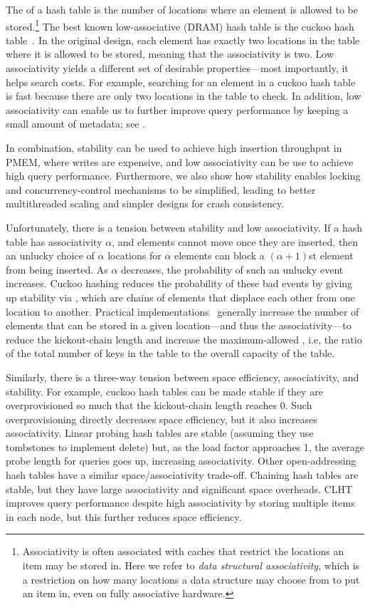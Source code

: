 The  of a hash table is the number of locations where an
element is allowed to be stored.\footnote{Associativity is often associated with
caches that restrict the locations an item may be stored in.  Here we refer to
\emph{data structural associativity}, which is a restriction on how many
locations a data structure may choose from to put an item in, even on fully
associative hardware.} The best known low-associative (DRAM) hash table is the
cuckoo hash table~\cite{Pagh:CuckooHash,PaghRo01}.  In the original design, each
element has exactly two locations in the table where it is allowed to be stored,
meaning that the associativity is two.  Low associativity yields a different set
of desirable properties---most importantly, it helps search costs. For example,
searching for an element in a cuckoo hash table is fast because there are only
two locations in the table to check.  In addition, low associativity can enable
us to further improve query performance by keeping a small amount of metadata;
see .


In combination, stability can be used to achieve high insertion throughput in
PMEM, where writes are expensive, and low associativity can be use to achieve
high query  performance.  Furthermore, we also show how stability enables
locking and concurrency-control mechanisms to be simplified, leading to better
multithreaded scaling and simpler designs for crash consistency.

Unfortunately, there is a tension between stability and low associativity.  If a
hash table has associativity $\alpha$, and elements cannot move once they are
inserted, then an unlucky choice of $\alpha$ locations for $\alpha$ elements can
block a $(\alpha+1)$st element from being inserted.  As $\alpha$ decreases, the
probability of such an unlucky event increases.  Cuckoo hashing reduces the
probability of these bad events by giving up stability via , which are chains of elements that displace each other from one location
to another. Practical implementations~\cite{LiAn14} generally increase the
number of elements that can be stored in a given location---and thus the
associativity---to reduce the kickout-chain length and increase the
maximum-allowed , i.e, the ratio of the total number of keys
in the table to the overall capacity of the table.


Similarly, there is a three-way tension between space efficiency, associativity,
and stability.  For example, cuckoo hash tables can be made stable if they are
overprovisioned so much that the kickout-chain length reaches 0.  Such
overprovisioning directly decreases space efficiency, but it also increases
associativity.  Linear probing hash tables are stable (assuming they use
tombstones to implement delete) but, as the load factor approaches 1, the
average probe length for queries goes up, increasing associativity.  Other
open-addressing hash tables have a similar space/associativity trade-off.
Chaining hash tables are stable, but they have large associativity and
significant space overheads.  CLHT~\cite{david2015asynchronized} improves query
performance despite high associativity by storing multiple items in each node,
but this further reduces space efficiency.

